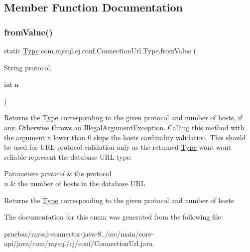 \subsection{Member Function Documentation}
\mbox{\label{enumcom_1_1mysql_1_1cj_1_1conf_1_1_connection_url_1_1_type_afad2e4b4bcf59858a3b9b1a673c9a837}} 
\subsubsection{\texorpdfstring{from\+Value()}{fromValue()}}
{\footnotesize\ttfamily static \mbox{\hyperlink{enumcom_1_1mysql_1_1cj_1_1conf_1_1_connection_url_1_1_type}{Type}} com.\+mysql.\+cj.\+conf.\+Connection\+Url.\+Type.\+from\+Value (\begin{DoxyParamCaption}\item[{String}]{protocol,  }\item[{int}]{n }\end{DoxyParamCaption})\hspace{0.3cm}{\ttfamily [static]}}

Returns the \mbox{\hyperlink{enumcom_1_1mysql_1_1cj_1_1conf_1_1_connection_url_1_1_type}{Type}} corresponding to the given protocol and number of hosts, if any. Otherwise throws an \mbox{\hyperlink{}{Illegal\+Argument\+Exception}}. Calling this method with the argument n lower than 0 skips the hosts cardinality validation. This should be used for U\+RL protocol validation only as the returned \mbox{\hyperlink{enumcom_1_1mysql_1_1cj_1_1conf_1_1_connection_url_1_1_type}{Type}} won\textquotesingle{}t won\textquotesingle{}t reliable represent the database U\+RL type.


\begin{DoxyParams}{Parameters}
{\em protocol} & the protocol \\
\hline
{\em n} & the number of hosts in the database U\+RL \\
\hline
\end{DoxyParams}
\begin{DoxyReturn}{Returns}
the \mbox{\hyperlink{enumcom_1_1mysql_1_1cj_1_1conf_1_1_connection_url_1_1_type}{Type}} corresponding to the given protocol and number of hosts 
\end{DoxyReturn}


The documentation for this enum was generated from the following file\+:\begin{DoxyCompactItemize}
\item 
pruebas/mysql-\/connector-\/java-\/8../src/main/core-\/api/java/com/mysql/cj/conf/Connection\+Url.\+java\end{DoxyCompactItemize}
